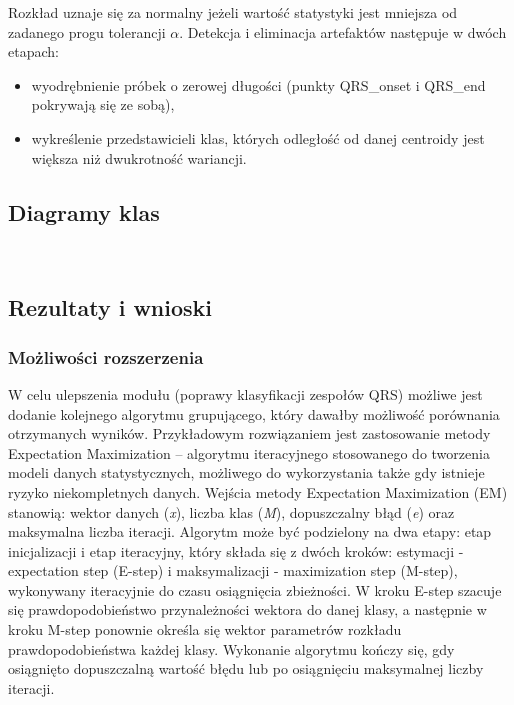 Rozkład uznaje się za normalny jeżeli wartość statystyki jest mniejsza od zadanego progu tolerancji $\alpha$.\newline
Detekcja i eliminacja artefaktów następuje w dwóch etapach:
\begin{itemize}
\item wyodrębnienie próbek o zerowej długości (punkty QRS\_onset i QRS\_end pokrywają się ze sobą),
\item wykreślenie przedstawicieli klas, których odległość od danej centroidy jest większa niż dwukrotność wariancji. 
\end{itemize}

\subsection{Diagramy klas}
\\
\subsection{Rezultaty i wnioski}
\subsubsection{Możliwości rozszerzenia}
W celu  ulepszenia modułu (poprawy klasyfikacji zespołów QRS) możliwe jest dodanie kolejnego algorytmu grupującego, który dawałby możliwość porównania otrzymanych wyników. Przykładowym rozwiązaniem jest zastosowanie metody Expectation Maximization – algorytmu iteracyjnego stosowanego do tworzenia modeli danych statystycznych, możliwego do wykorzystania także gdy istnieje ryzyko niekompletnych danych.
\newline\newline Wejścia metody Expectation Maximization (EM) stanowią: wektor danych (\textit{x}), liczba klas (\textit{M}), dopuszczalny błąd (\textit{e}) oraz maksymalna liczba iteracji. Algorytm może być podzielony na dwa etapy: etap inicjalizacji i etap iteracyjny, który składa się z dwóch kroków: estymacji - expectation step (E-step) i maksymalizacji - maximization step (M-step), wykonywany iteracyjnie do czasu osiągnięcia zbieżności.
\newline\newline W kroku E-step szacuje się prawdopodobieństwo przynależności wektora do danej klasy, a następnie w kroku M-step ponownie określa się wektor parametrów rozkładu prawdopodobieństwa każdej klasy. Wykonanie algorytmu kończy się, gdy osiągnięto dopuszczalną wartość błędu lub po osiągnięciu maksymalnej liczby iteracji.

